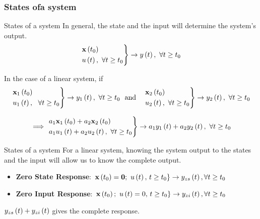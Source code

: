 \documentclass[aspectratio=169]{beamer}
\def\mf{\ensuremath\mathbf}
\def\lp{\ensuremath\left(}
\def\rp{\ensuremath\right)}
\begin{document}
\begin{frame}[t]
    \frametitle{States ofa  system}
    
\end{frame}


\begin{frame}{States of a system}
In general, the state and the input will determine the system's output.
\[ \begin{rcases}
\mf{x}\lp t_0 \rp \\
u\lp t\rp, \,\, \forall t \geq t_0
\end{rcases} \rightarrow y\lp t\rp, \,\, \forall t \geq t_0 \]

In the case of a linear system, if 
\[ \begin{rcases}
\mf{x}_1\lp t_0 \rp \\
u_1\lp t\rp, \,\,\,\, \forall t \geq t_0
\end{rcases} \rightarrow y_1\lp t\rp, \,\, \forall t \geq t_0 \,\, \text{ and }\,\,\,\, 
\begin{rcases}
\mf{x}_2\lp t_0 \rp \\
u_2\lp t\rp, \,\, \forall t \geq t_0
\end{rcases} \rightarrow y_2\lp t\rp, \,\, \forall t \geq t_0
\]

\[ \implies \begin{rcases}
a_1\mf{x}_1\lp t_0 \rp + a_2\mf{x}_2\lp t_0 \rp \\
a_1u_1\lp t\rp + a_2u_2\lp t\rp, \,\, \forall t \geq t_0
\end{rcases} \rightarrow a_1y_1\lp t\rp + a_2y_2\lp t\rp, \,\, \forall t \geq t_0
\]
\end{frame}


\begin{frame}[t]{States of a system}
For a linear system, knowing the system output to the states and the input will allow us to know the complete output.

\begin{itemize}
  \item \textbf{Zero State Response}: $\left. \mf{x}\lp t_0\rp = \mf{0}; \,\, u\lp t\rp, \, t \geq t_0\right\} \rightarrow y_{zs}\lp t\rp, \forall t \geq t_0$
  \item \textbf{Zero Input Response}: $\left. \mf{x}\lp t_0\rp; \,\, u\lp t\rp = 0, \, t \geq t_0\right\} \rightarrow y_{zi}\lp t\rp, \forall t \geq t_0$
\end{itemize}
\vspace{0.5cm}
$y_{zs}\lp t\rp + y_{zi}\lp t\rp$ gives the complete response.
\end{frame}
\end{document}
